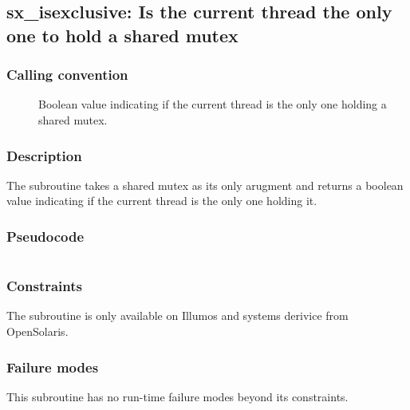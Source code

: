 \clearpage
{}
{}
\label{subr:sx-isexclusive}
\subsection*{sx\_isexclusive: Is the current thread the only one to
  hold a shared mutex }

\subsubsection*{Calling convention}

\begin{description}
\item[] Boolean value indicating if the current thread
  is the only one holding a shared mutex.
\end{description}

\subsubsection*{Description}

The  subroutine takes a shared mutex as
its only arugment and returns a boolean value indicating if the
current thread is the only one holding it.

\subsubsection*{Pseudocode}

\begin{verbatim}
\end{verbatim}

\subsubsection*{Constraints}

The  subroutine is only available on
Illumos and systems derivice from OpenSolaris.

\subsubsection*{Failure modes}

This subroutine has no run-time failure modes beyond its constraints.
